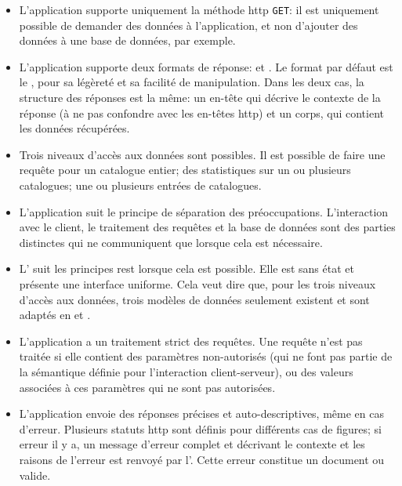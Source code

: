 \begin{itemize}
	\item L'application supporte uniquement la méthode \gls{http} \texttt{GET}: il est uniquement possible de demander des données à l'application, et non d'ajouter des données à une base de données, par exemple.
	\item L'application supporte deux formats de réponse: \json{} et \xmltei{}. Le format par défaut est le \json{}, pour sa légèreté et sa facilité de manipulation. Dans les deux cas, la structure des réponses est la même: un en-tête qui décrive le contexte de la réponse (à ne pas confondre avec les en-têtes \gls{http}) et un corps, qui contient les données récupérées.
	\item Trois niveaux d'accès aux données sont possibles. Il est possible de faire une requête pour un catalogue entier; des statistiques sur un ou plusieurs catalogues; une ou plusieurs entrées de catalogues.
	\item L'application suit le principe de séparation des préoccupations. L'interaction avec le client, le traitement des requêtes et la base de données sont des parties distinctes qui ne communiquent que lorsque cela est nécessaire.
	\item L'\api{} suit les principes \gls{rest} lorsque cela est possible. Elle est sans état et présente une interface uniforme. Cela veut dire que, pour les trois niveaux d'accès aux données, trois modèles de données seulement existent et sont adaptés en \json{} et \xmltei{}.
	\item L'application a un traitement strict des requêtes. Une requête n'est pas traitée si elle contient des paramètres non-autorisés (qui ne font pas partie de la sémantique définie pour l'interaction client-serveur), ou des valeurs associées à ces paramètres qui ne sont pas autorisées.
	\item L'application envoie des réponses précises et auto-descriptives, même en cas d'erreur. Plusieurs statuts \gls{http} sont définis pour différents cas de figures; si erreur il y a, un message d'erreur complet et décrivant le contexte et les raisons de l'erreur est renvoyé par l'\api{}. Cette erreur constitue un document \json{} ou \xmltei{} valide.
\end{itemize}

